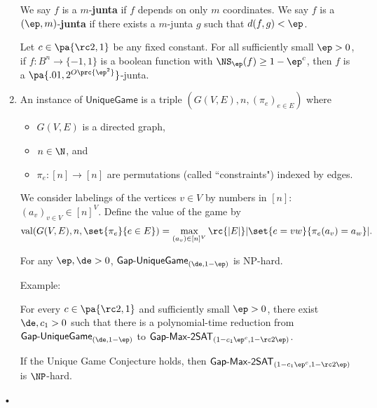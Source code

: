 \begin{enumerate}
\begin{df}
We say $f$ is a $m$-\textbf{junta} if $f$ depends on only $m$ coordinates. We say $f$ is a $(\ep, m)$-\textbf{junta} if there exists a $m$-junta $g$ such that $d(f,g)<\ep$.
\end{df}
\begin{thm}\label{thm:ns-bourgain}
Let $c\in \pa{\rc2,1}$ be any fixed constant. For all sufficiently small $\ep> 0$, if
$f:B^n\to \{-1,1\}$ is a boolean function with $\NS_\ep(f)\ge 1-\ep^c$, then $f$ is a $\pa{.01,2^{O\prc{\ep^2}}}$-junta.
\end{thm}
\item
\begin{df}
An instance of $\mathsf{Unique Game}$ is a triple $(G(V,E),n,(\pi_e)_{e\in E})$ where
\begin{itemize}
\item
$G(V,E)$ is a directed graph, 
\item $n\in \N$, and 
\item
$\pi_e:[n]\to [n]$ are permutations (called ``constraints") indexed by edges.
\end{itemize}
We consider labelings of the vertices $v\in V$ by numbers in $[n]$: $(a_v)_{v\in V}\in [n]^V$. 
Define the value of the game by
\[
\text{val}(G(V,E),n,\set{\pi_e}{e\in E})
=\max_{(a_v)\in [n]^V} 
\rc{|E|}
|\set{e=vw}{\pi_e(a_v)=a_w}|.
\]
\end{df}
\begin{conj}
For any $\ep,\de>0$,  $\mathsf{Gap}\text{-}\mathsf{Unique Game}_{(\de,1-\ep)}$ is NP-hard.
\end{conj}
Example:

\begin{thm}[Inapproximability of {\sf{Max-2SAT}}, %
{\cite[Theorem 4.1]{Kho05}}]\label{thm:min-2sat-deletion}
For every $c\in \pa{\rc 2,1}$ and sufficiently small $\ep>0$, there exist $\de,c_1>0$ such that there is a polynomial-time reduction from $\mathsf{Gap}\text{-}\mathsf{UniqueGame}_{(\de,1-\ep)}$ to 
$\mathsf{Gap}\text{-}\mathsf{Max}\text{-}\mathsf{2SAT}_{(1-c_1\ep^c,1-\rc2\ep)}$.

If the Unique Game Conjecture holds, then $\mathsf{Gap}\text{-}\mathsf{Max}\text{-}\mathsf{2SAT}_{(1-c_1\ep^c,1-\rc2\ep)}$ is $\NP$-hard.
\end{thm}
\end{enumerate}•


